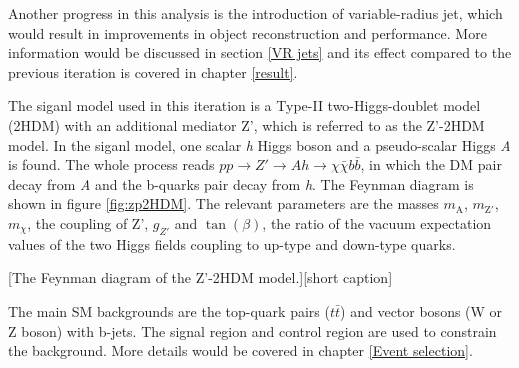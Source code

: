 \documentclass[class=NCU_thesis, crop=false]{standalone}
\begin{document}
	Another progress in this analysis is the introduction of variable-radius jet, which would result in improvements in object reconstruction and performance. More information would be discussed in section \ref{VR jets} and its effect compared to the previous iteration is covered in chapter \ref{result}.
	
	The siganl model used in this iteration is a Type-II two-Higgs-doublet model (2HDM) with an additional mediator Z', which is referred to as the Z'-2HDM model. In the siganl model, one scalar \textit{h} Higgs boson and a pseudo-scalar Higgs \textit{A} is found. The whole process reads $pp \rightarrow Z' \rightarrow Ah \rightarrow \chi \bar{\chi} b \bar{b}$, in which the DM pair decay from \textit{A} and the b-quarks pair decay from \textit{h}. The Feynman diagram is shown in figure \ref{fig:zp2HDM}. The relevant parameters are the masses $m_{\mathrm{A}}$, $m_{\mathrm{Z'}}$, $m_{\chi}$, the coupling of Z', $g_{Z'}$ and $\tan(\beta)$, the ratio of the vacuum expectation values of the two Higgs fields coupling to up-type and down-type quarks.
	
	[The Feynman diagram of the Z'-2HDM model.][short caption]
	
	The main SM backgrounds are the top-quark pairs ($t\bar{t}$) and vector bosons (W or Z boson) with b-jets. The signal region and control region are used to constrain the background. More details would be covered in chapter \ref{Event selection}.
	
\end{document}
